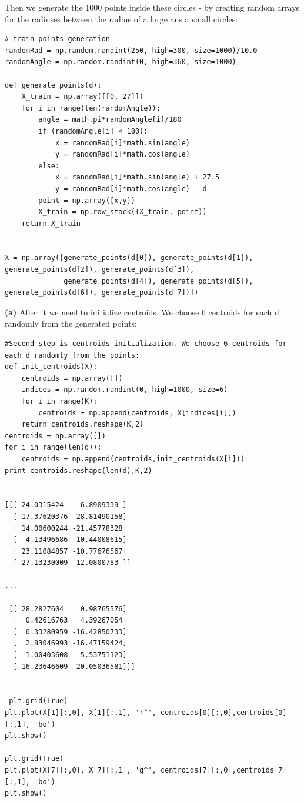 \documentclass[a4paper, 12pt]{article}
\begin{document}
Then we generate the 1000 points inside these circles - by creating random arrays for the radiuses between the radius of a large ans a small circles:
\begin{lstlisting}
# train points generation
randomRad = np.random.randint(250, high=300, size=1000)/10.0
randomAngle = np.random.randint(0, high=360, size=1000)

def generate_points(d):
    X_train = np.array([[0, 27]])
    for i in range(len(randomAngle)):
        angle = math.pi*randomAngle[i]/180
        if (randomAngle[i] < 180):
            x = randomRad[i]*math.sin(angle)
            y = randomRad[i]*math.cos(angle)
        else:
            x = randomRad[i]*math.sin(angle) + 27.5
            y = randomRad[i]*math.cos(angle) - d
        point = np.array([x,y])
        X_train = np.row_stack((X_train, point))
    return X_train


X = np.array([generate_points(d[0]), generate_points(d[1]), generate_points(d[2]), generate_points(d[3]),
              generate_points(d[4]), generate_points(d[5]), generate_points(d[6]), generate_points(d[7])])
\end{lstlisting}

\textbf{(a)} After it we need to initialize centroids. We choose 6 centroids for each d randomly from the generated points:

\begin{lstlisting}
#Second step is centroids initialization. We choose 6 centroids for each d randomly from the points:
def init_centroids(X):
    centroids = np.array([])
    indices = np.random.randint(0, high=1000, size=6)
    for i in range(K):
        centroids = np.append(centroids, X[indices[i]])
    return centroids.reshape(K,2)
centroids = np.array([])
for i in range(len(d)):
    centroids = np.append(centroids,init_centroids(X[i]))
print centroids.reshape(len(d),K,2)


[[[ 24.0315424    6.8909339 ]
  [ 17.37620376  28.81490158]
  [ 14.00600244 -21.45778328]
  [  4.13496686  10.44008615]
  [ 23.11084857 -10.77676567]
  [ 27.13230009 -12.0800783 ]]

...

 [[ 28.2827604    0.98765576]
  [  0.42616763   4.39267054]
  [  0.33280959 -16.42850733]
  [  2.83046993 -16.47159424]
  [  1.00403608  -5.53751123]
  [ 16.23646609  20.05036581]]]


 plt.grid(True)
plt.plot(X[1][:,0], X[1][:,1], 'r^', centroids[0][:,0],centroids[0][:,1], 'bo')
plt.show()

plt.grid(True)
plt.plot(X[7][:,0], X[7][:,1], 'g^', centroids[7][:,0],centroids[7][:,1], 'bo')
plt.show()
\end{lstlisting}
\end{document}
